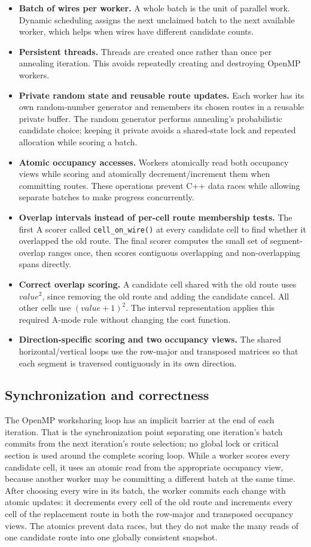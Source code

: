 \documentclass[11pt]{article}
\begin{document}
\begin{itemize}
\item \textbf{Batch of wires per worker.} A whole batch is the unit of
parallel work. Dynamic scheduling assigns the next unclaimed batch to the next
available worker, which helps when wires have different candidate counts.
\item \textbf{Persistent threads.} Threads are created once rather than once
per annealing iteration. This avoids repeatedly creating and destroying OpenMP
workers.
\item \textbf{Private random state and reusable route updates.} Each worker
has its own random-number generator and remembers its chosen routes in a
reusable private buffer. The random generator performs annealing's
probabilistic candidate choice; keeping it private avoids a shared-state lock
and repeated allocation while scoring a batch.
\item \textbf{Atomic occupancy accesses.} Workers atomically read both
occupancy views while scoring and atomically decrement/increment them when
committing routes. These operations prevent C++ data races while allowing
separate batches to make progress concurrently.
\item \textbf{Overlap intervals instead of per-cell route membership tests.}
The first A scorer called \texttt{cell\_on\_wire()} at every candidate cell to
find whether it overlapped the old route. The final scorer computes the small
set of segment-overlap ranges once, then scores contiguous overlapping and
non-overlapping spans directly.
\item \textbf{Correct overlap scoring.} A candidate cell shared with the old
route uses $value^2$, since removing the old route and adding the candidate
cancel. All other cells use $(value+1)^2$. The interval representation applies
this required A-mode rule without changing the cost function.
\item \textbf{Direction-specific scoring and two occupancy views.} The shared
horizontal/vertical loops use the row-major and transposed matrices so that
each segment is traversed contiguously in its own direction.
\end{itemize}

\subsection{Synchronization and correctness}

The OpenMP worksharing loop has an implicit barrier at the end of each
iteration. That is the synchronization point separating one iteration's batch
commits from the next iteration's route selection; no global lock or critical
section is used around the complete scoring loop. While a worker scores every
candidate cell, it uses an atomic read from the appropriate occupancy view,
because another worker may be committing a different batch at the same time.
After choosing every wire in its batch, the worker commits each change with
atomic updates: it decrements every cell of the old route and increments every
cell of the replacement route in both the row-major and transposed occupancy
views. The atomics prevent data races, but they do not make the many reads of
one candidate route into one globally consistent snapshot.
\end{document}
